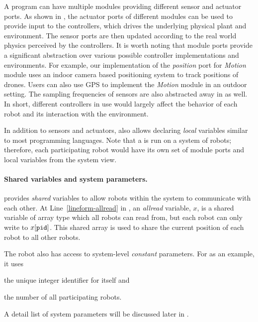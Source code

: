 A \lgname program can have multiple modules providing different sensor and actuator ports.
As shown in , the actuator ports of different modules can be used to provide input to the controllers,
which drives the underlying physical plant and environment.
The sensor ports are then updated according to the real world physics perceived by the controllers.
It is worth noting that module ports provide a significant abstraction over various possible controller implementations and environments.
For example, our implementation of the \emph{position} port for \emph{Motion} module uses an indoor camera based positioning system
to track positions of drones.
Users can also use GPS to implement the \emph{Motion} module in an outdoor setting.
The sampling frequencies of sensors are also abstracted away in \lgname as well.
In short, different controllers in use would largely affect the behavior of each robot and its interaction with the environment.

In addition to sensors and actuators, \lgname also allows declaring \emph{local} variables similar to most programming languages.
Note that a \lgname is run on a system of robots;
therefore, each participating robot would have its own set of module ports and local variables from the system view.


\paragraph{Shared variables and system parameters.}
\lgname provides \emph{shared} variables to allow robots within the system to communicate with each other.
At Line~\ref{lineform-allread} in , an \emph{allread} variable, $x$, is a shared variable of array type which all robots can read from,
but each robot \myuin can only write to $x[\texttt{pid}]$.
This shared array is used to share the current position of each robot to all other robots.

The robot also has access to system-level \emph{constant} parameters.
For \LineForm as an example, it uses
\begin{inparaenum}[(a)]
    \item the unique integer identifier \myuin for itself and
    \item the number \NMAX of all participating robots.
\end{inparaenum}
A detail list of system parameters will be discussed later in .


